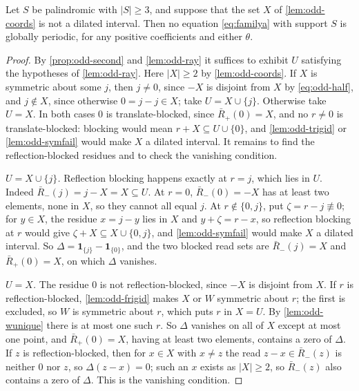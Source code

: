 \begin{theorem}
\label{thm:odd-nondil}
Let $S$ be palindromic with $|S|\ge3$, and suppose that the set $X$ of
\autoref{lem:odd-coords} is not a dilated interval. Then no equation
\eqref{eq:familya} with support $S$ is globally periodic, for any positive
coefficients and either $\theta$.
\end{theorem}

\begin{proof}
By \autoref{prop:odd-second} and \autoref{lem:odd-ray} it suffices to
exhibit $U$ satisfying the hypotheses of \autoref{lem:odd-ray}. Here
$|X|\ge2$ by \autoref{lem:odd-coords}. If $X$ is symmetric about some $j$, then $j\ne0$, since $-X$ is
disjoint from $X$ by \eqref{eq:odd-half}, and $j\notin X$, since otherwise
$0=j-j\in X$; take $U=X\cup\{j\}$. Otherwise take $U=X$. In both cases $0$ is
translate-blocked, since $\bar R_+(0)=X$, and no $r\ne0$ is translate-blocked:
blocking would mean $r+X\subseteq U\cup\{0\}$, and \autoref{lem:odd-trigid}
or \autoref{lem:odd-symfail} would make $X$ a dilated interval. It remains to
find the reflection-blocked residues and to check the vanishing condition.

\emph{$U=X\cup\{j\}$.} Reflection blocking happens exactly at $r=j$, which
lies in $U$. Indeed $\bar R_-(j)=j-X=X\subseteq U$. At $r=0$, $\bar R_-(0)=-X$ has at least two elements,
none in $X$, so they cannot all equal $j$. At $r\notin\{0,j\}$, put
$\zeta=r-j\not\equiv0$; for $y\in X$, the residue $x=j-y$ lies in $X$ and
$y+\zeta=r-x$, so reflection blocking at $r$ would give
$\zeta+X\subseteq X\cup\{0,j\}$, and \autoref{lem:odd-symfail} would make $X$
a dilated interval. So $\Delta=\mathbf 1_{\{j\}}-\mathbf 1_{\{0\}}$, and the
two blocked read sets are $\bar R_-(j)=X$ and $\bar R_+(0)=X$, on which
$\Delta$ vanishes.

\emph{$U=X$.} The residue $0$ is not reflection-blocked, since $-X$ is
disjoint from $X$. If $r$ is reflection-blocked, \autoref{lem:odd-frigid}
makes $X$ or $W$ symmetric about $r$; the first is excluded, so $W$ is
symmetric about $r$, which puts $r$ in $X=U$. By \autoref{lem:odd-wunique}
there is at most one such $r$. So $\Delta$ vanishes on all of $X$ except at
most one point, and $\bar R_+(0)=X$, having at least two elements, contains a
zero of $\Delta$. If $z$ is reflection-blocked, then for $x\in X$ with $x\ne z$
the read $z-x\in\bar R_-(z)$ is neither $0$ nor $z$, so $\Delta(z-x)=0$; such
an $x$ exists as $|X|\ge2$, so $\bar R_-(z)$ also contains a zero of
$\Delta$. This is the vanishing condition.
\end{proof}

